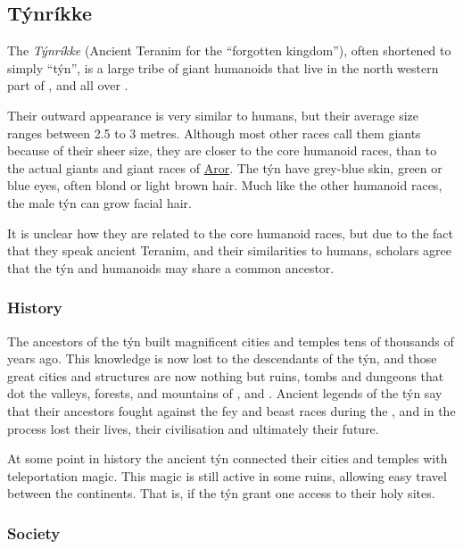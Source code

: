 \subsection{Týnríkke}
\label{sec:Tynrikke}

The \emph{Týnríkke} (Ancient Teranim for the ``forgotten kingdom''), often
shortened to simply ``týn'', is a large tribe of giant humanoids that live in
the north western part of , and all over
.

Their outward appearance is very similar to humans, but their average size
ranges between 2.5 to 3 metres. Although most other races call them giants
because of their sheer size, they are closer to the core humanoid races, than
to the actual giants and giant races of \hyperref[sec:Aror]{Aror}. The týn
have grey-blue skin, green or blue eyes, often blond or light brown hair.
Much like the other humanoid races, the male týn can grow facial hair.

It is unclear how they are related to the core humanoid races, but due to the
fact that they speak ancient Teranim, and their similarities to humans,
scholars agree that the týn and humanoids may share a common ancestor.

\subsubsection{History}

The ancestors of the týn built magnificent cities and temples tens of thousands
of years ago. This knowledge is now lost to the descendants of the týn, and
those great cities and structures are now nothing but ruins, tombs and dungeons
that dot the valleys, forests, and mountains of ,
 and . Ancient legends of the týn
say that their ancestors fought against the fey and beast races during the
, and in the process lost their lives, their
civilisation and ultimately their future.

At some point in history the ancient týn connected their cities and temples
with teleportation magic. This magic is still active in some ruins, allowing
easy travel between the continents. That is, if the týn grant one access to
their holy sites.

\subsubsection{Society}

